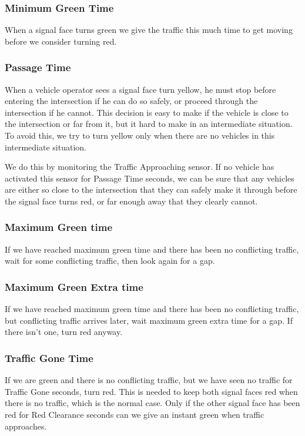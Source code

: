 \documentclass[letterpaper,twoside]{article}
\begin{document}
\subsubsection{Minimum Green Time}
When a signal face turns green we give the traffic this much time
to get moving before we consider turning red.

\subsubsection{Passage Time}
When a vehicle operator sees a signal face turn yellow, he must stop
before entering the intersection if he can do so safely, or proceed
through the intersection if he cannot.  This decision is easy to make
if the vehicle is close to the intersection or far from it, but it hard
to make in an intermediate situation.  To avoid this, we try to turn
yellow only when there are no vehicles in this intermediate situation.

We do this by monitoring the Traffic Approaching sensor.  If no vehicle
has activated this sensor for Passage Time seconds, we can be sure
that any vehicles are either so close to the intersection that they
can safely make it through before the signal face turns red, or far
enough away that they clearly cannot.

\subsubsection{Maximum Green time}
If we have reached maximum green time and there has been no conflicting
traffic, wait for some conflicting traffic, then look again for a gap.

\subsubsection{Maximum Green Extra time}
If we have reached maximum green time and there has been no conflicting
traffic, but conflicting traffic arrives later, wait maximum green extra time
for a gap.  If there isn't one, turn red anyway.

\subsubsection{Traffic Gone Time}
If we are green and there is no conflicting traffic,
but we have seen no traffic for Traffic Gone seconds, turn red.
This is needed to keep both signal faces
red when there is no traffic, which is the normal case.  Only if the other
signal face has been red for Red Clearance seconds can we give
an instant green when traffic approaches.
\end{document}
